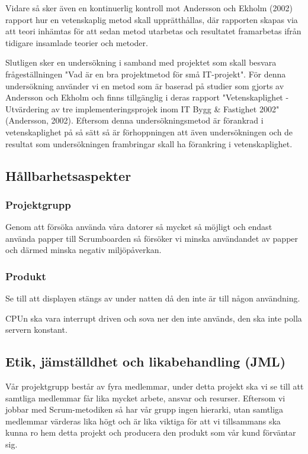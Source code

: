 \documentclass[11pt]{article}
\begin{document}
Vidare så sker även en kontinuerlig kontroll mot Andersson och Ekholm
(2002) rapport hur en vetenskaplig metod skall upprätthållas, där
rapporten skapas via att teori inhämtas för att sedan metod utarbetas
och resultatet framarbetas ifrån tidigare insamlade teorier och metoder.

Slutligen sker en undersökning i samband med projektet som skall besvara frågeställningen
"Vad är en bra projektmetod för små IT-projekt". För denna undersökning använder vi en metod
som är baserad på studier som gjorts av Andersson och Ekholm och finns tillgänglig i deras
rapport "Vetenskaplighet - Utvärdering av tre implementeringsprojek inom IT Bygg \& Fastighet 2002" (Andersson, 2002).
Eftersom denna undersökningsmetod är förankrad i vetenskaplighet på så sätt så är förhoppningen att
även undersökningen och de resultat som undersökningen frambringar skall ha förankring i vetenskaplighet.
\subsection{Hållbarhetsaspekter}
\label{sec:org2e89684}
\subsubsection{Projektgrupp}
\label{sec:orge9dc2f7}

Genom att försöka använda våra datorer så mycket så möjligt och
endast använda papper till Scrumboarden så försöker vi minska
användandet av papper och därmed minska negativ miljöpåverkan.

\subsubsection{Produkt}
\label{sec:org66bfa73}

Se till att displayen stängs av under natten då den inte är till
någon användning.

CPUn ska vara interrupt driven och sova ner den inte används, den ska
inte polla servern konstant.

\subsection{Etik, jämställdhet och likabehandling (JML)}
\label{sec:orgffc2afb}
Vår projektgrupp består av fyra medlemmar, under detta projekt ska vi
se till att samtliga medlemmar får lika mycket arbete, ansvar och
resurser. Eftersom vi jobbar med Scrum-metodiken så har vår grupp
ingen hierarki, utan samtliga medlemmar värderas lika högt och är
lika viktiga för att vi tillsammans ska kunna ro hem detta projekt
och producera den produkt som vår kund förväntar sig.
\end{document}
